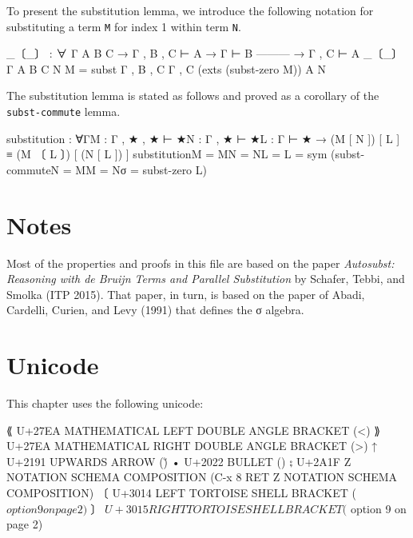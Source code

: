 To present the substitution lemma, we introduce the following notation
for substituting a term \texttt{M} for index 1 within term \texttt{N}.

\begin{fence}
\begin{code}
_〔_〕 : ∀ {Γ A B C}
        → Γ , B , C ⊢ A
        → Γ ⊢ B
          ---------
        → Γ , C ⊢ A
_〔_〕 {Γ} {A} {B} {C} N M =
   subst {Γ , B , C} {Γ , C} (exts (subst-zero M)) {A} N
\end{code}
\end{fence}

The substitution lemma is stated as follows and proved as a corollary of
the \texttt{subst-commute} lemma.

\begin{fence}
\begin{code}
substitution : ∀{Γ}{M : Γ , ★ , ★ ⊢ ★}{N : Γ , ★ ⊢ ★}{L : Γ ⊢ ★}
    → (M [ N ]) [ L ] ≡ (M 〔 L 〕) [ (N [ L ]) ]
substitution{M = M}{N = N}{L = L} =
   sym (subst-commute{N = M}{M = N}{σ = subst-zero L})
\end{code}
\end{fence}

\hypertarget{notes}{%
\section{Notes}\label{notes}}

Most of the properties and proofs in this file are based on the paper
\emph{Autosubst: Reasoning with de Bruijn Terms and Parallel
Substitution} by Schafer, Tebbi, and Smolka (ITP 2015). That paper, in
turn, is based on the paper of Abadi, Cardelli, Curien, and Levy (1991)
that defines the σ algebra.

\hypertarget{unicode}{%
\section{Unicode}\label{unicode}}

This chapter uses the following unicode:

\begin{myDisplay}
⟪  U+27EA  MATHEMATICAL LEFT DOUBLE ANGLE BRACKET (\<<)
⟫  U+27EA  MATHEMATICAL RIGHT DOUBLE ANGLE BRACKET (\>>)
↑  U+2191  UPWARDS ARROW (\u)
•  U+2022  BULLET (\bub)
⨟  U+2A1F  Z NOTATION SCHEMA COMPOSITION (C-x 8 RET Z NOTATION SCHEMA COMPOSITION)
〔  U+3014  LEFT TORTOISE SHELL BRACKET (\( option 9 on page 2)
〕  U+3015  RIGHT TORTOISE SHELL BRACKET (\) option 9 on page 2)
\end{myDisplay}

